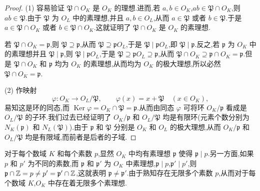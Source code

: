 \begin{proof}
(1) 容易验证 $\mathfrak{P}\cap O_K$ 是 $O_K$ 的理想.进而,若 $a,b\in O_K$,$ab\in\mathfrak{P}\cap O_K$,则 $ab\in\mathfrak{P}$.由于 $\mathfrak{P}$ 为 $O_L$ 中的素理想,并且 $a,b\in O_L$,从而 $a\in\mathfrak{P}$ 或者 $b\in\mathfrak{P}$.于是 $a\in\mathfrak{P}\cap O_K$ 或者 $b\in\mathfrak{P}\cap O_K$.这就证明了 $\mathfrak{P}\cap O_K$ 是 $O_K$ 的素理想.

若 $\mathfrak{P}\cap O_K=\mathfrak{p}$,则 $\mathfrak{P}\supseteq\mathfrak{p}$,从而 $\mathfrak{P}\supseteq\mathfrak{p}O_L$,于是 $\mathfrak{P}\mid\mathfrak{p}O_L$,即 $\mathfrak{P}\mid\mathfrak{p}$.反之,若 $\mathfrak{p}$ 为 $O_K$ 中的素理想并且 $\mathfrak{P}\mid\mathfrak{p}$,则 $\mathfrak{P}\mid\mathfrak{p}O_L$,于是 $\mathfrak{P}\supseteq\mathfrak{p}O_L\supseteq\mathfrak{p}$,从而 $\mathfrak{P}\cap O_K\supseteq\mathfrak{p}\cap O_K=\mathfrak{p}$.但是 $\mathfrak{P}\cap O_K$ 和 $\mathfrak{p}$ 均为 $O_K$ 的素理想,从而均为 $O_K$ 的极大理想,所以必然 $\mathfrak{P}\cap O_K=\mathfrak{p}$.

(2) 作映射
\[
  \varphi\colon O_K\to O_L/\mathfrak{P},\qquad \varphi(x)=x+\mathfrak{P}\quad (x\in O_K),
\]
易知这是环的同态,而 $\operatorname{Ker}\varphi=O_K\cap\mathfrak{P}=\mathfrak{p}$.从而由同态 $\varphi$ 可将环 $O_K/\mathfrak{p}$ 看成是 $O_L/\mathfrak{P}$ 的子环.我们过去已经证明了 $O_K/\mathfrak{p}$ 和 $O_L/\mathfrak{P}$ 均是有限环(元素个数分别为 $N_K(\mathfrak{p})$ 和 $N_L(\mathfrak{P})$).由于 $\mathfrak{p}$ 和 $\mathfrak{P}$ 分别是 $O_K$ 和 $O_L$ 的极大理想,从而 $O_K/\mathfrak{p}$ 和 $O_L/\mathfrak{P}$ 均是有限域,而前者是后者的子域.
\end{proof}

\begin{remark}
对于每个数域 $K$ 和每个素数 $p$,显然 $O_K$ 中均有素理想 $\mathfrak{p}$ 使得 $\mathfrak{p}\mid p$.另一方面,如果 $p$ 和 $p'$ 为不同的素数,而 $\mathfrak{p}$ 和 $\mathfrak{p}'$ 为 $O_K$ 中素理想,$\mathfrak{p}\mid p$,$\mathfrak{p}'\mid p'$,则 $\mathfrak{p}\cap\mathbb{Z}=p\neq p'=\mathfrak{p}'\cap\mathbb{Z}$,这就表明 $\mathfrak{p}\neq\mathfrak{p}'$.由于熟知存在无限多个素数 $p$,从而对于每个数域 $K$,$O_K$ 中存在着无限多个素理想.
\end{remark}

